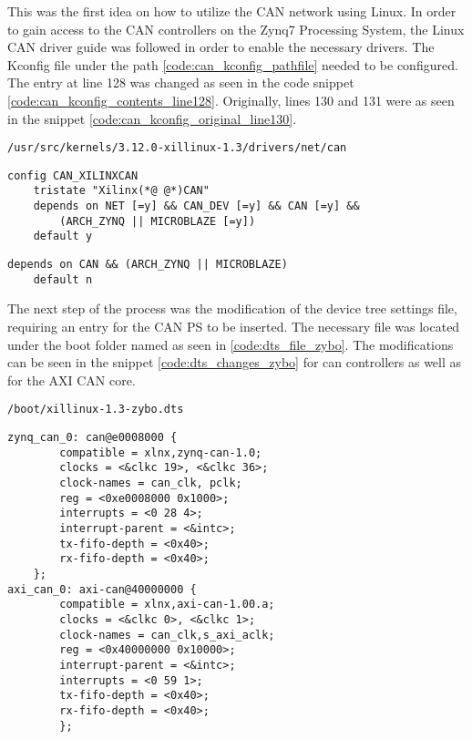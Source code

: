 This was the first idea on how to utilize the CAN network using Linux.
In order to gain access to the CAN controllers on the Zynq7 Processing System, the Linux CAN driver guide \cite{Xilinx_wiki_Linux_CAN_driver} was followed in order to enable the necessary drivers.
The Kconfig file under the path \ref{code:can_kconfig_pathfile} needed to be configured.
The entry at line 128 was changed as seen in the code snippet \ref{code:can_kconfig_contents_line128}.
Originally, lines 130 and 131 were as seen in the snippet \ref{code:can_kconfig_original_line130}.

\begin{lstlisting}[caption={CAN Kconfig pathfile.},numbers=none,label=code:can_kconfig_pathfile]
/usr/src/kernels/3.12.0-xillinux-1.3/drivers/net/can
\end{lstlisting}

\begin{lstlisting}[firstnumber=128,caption={Kconfig file contents from line 128.},label={code:can_kconfig_contents_line128}]
config CAN_XILINXCAN
	tristate "Xilinx(*@ @*)CAN"
	depends on NET [=y] && CAN_DEV [=y] && CAN [=y] && 
        (ARCH_ZYNQ || MICROBLAZE [=y])
	default y
\end{lstlisting}

\begin{lstlisting}[firstnumber=130,caption={Original content of lines 130 and 131.},label={code:can_kconfig_original_line130}]
	depends on CAN && (ARCH_ZYNQ || MICROBLAZE)
	default n
\end{lstlisting}

The next step of the process was the modification of the device tree settings file, requiring an entry for the CAN PS to be inserted.
The necessary file was located under the boot folder named as seen in \ref{code:dts_file_zybo}.
The modifications can be seen in the snippet \ref{code:dts_changes_zybo} for can controllers as well as for the AXI CAN core.

\begin{lstlisting}[numbers=none,caption={Device tree settings file and its path.},label={code:dts_file_zybo}]
/boot/xillinux-1.3-zybo.dts
\end{lstlisting}
\begin{lstlisting}[caption={Device tree settings changes.},label={code:dts_changes_zybo}]
zynq_can_0: can@e0008000 {
        compatible = xlnx,zynq-can-1.0;
        clocks = <&clkc 19>, <&clkc 36>;
        clock-names = can_clk, pclk;
        reg = <0xe0008000 0x1000>;
        interrupts = <0 28 4>;
        interrupt-parent = <&intc>;
        tx-fifo-depth = <0x40>;
        rx-fifo-depth = <0x40>;
    };
axi_can_0: axi-can@40000000 {
        compatible = xlnx,axi-can-1.00.a;
        clocks = <&clkc 0>, <&clkc 1>;
        clock-names = can_clk,s_axi_aclk;
        reg = <0x40000000 0x10000>;
        interrupt-parent = <&intc>;
        interrupts = <0 59 1>;
        tx-fifo-depth = <0x40>;
        rx-fifo-depth = <0x40>;
        };
\end{lstlisting}


